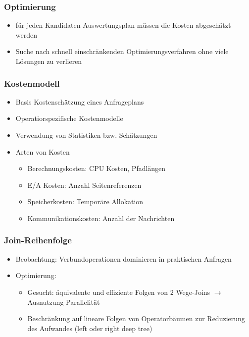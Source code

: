 \documentclass[a4paper]{article}
\begin{document}
    \subsubsection{Optimierung}
    \begin{itemize}
        \item für jeden Kandidaten-Auswertungsplan müssen die Kosten abgeschätzt werden
        \item Suche nach schnell einschränkenden Optimierungsverfahren ohne viele Lösungen zu verlieren
    \end{itemize}
    
    \subsubsection{Kostenmodell}
    \begin{itemize}
        \item Basis Kostenschätzung eines Anfrageplans
        \item Operatiorspezifische Kostenmodelle
        \item Verwendung von Statistiken bzw. Schätzungen
        \item Arten von Kosten
        \begin{itemize}
            \item Berechnungskosten: CPU Kosten, Pfadlängen
            \item E/A Kosten: Anzahl Seitenreferenzen
            \item Speicherkosten: Temporäre Allokation
            \item Kommunikationskosten: Anzahl der Nachrichten
        \end{itemize}
    \end{itemize}
    
    \subsubsection{Join-Reihenfolge}
    \begin{itemize}
        \item Beobachtung: Verbundoperationen dominieren in praktischen Anfragen
        \item Optimierung: 
        \begin{itemize}
            \item Gesucht: äquivalente und effiziente Folgen von 2 Wege-Joins $\to$ Ausnutzung Parallelität
            \item Beschränkung auf lineare Folgen von Operatorbäumen zur Reduzierung des Aufwandes (left oder right deep tree)
        \end{itemize}
    \end{itemize}
    
\end{document}
